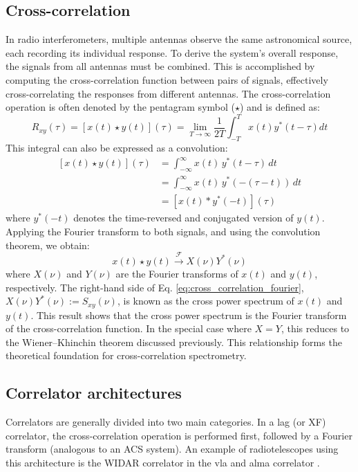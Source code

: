 \subsection{Cross-correlation}
\label{sec:cross_correlation}
In radio interferometers, multiple antennas observe the same astronomical source, each recording its individual response. To derive the system's overall response, the signals from all antennas must be combined. This is accomplished by computing the cross-correlation function between pairs of signals, effectively cross-correlating the responses from different antennas.
The cross-correlation operation is often denoted by the pentagram symbol ($\star$) and is defined as:
\begin{equation}
	R_{xy}(\tau)=\left[x(t) \star y(t)\right](\tau) = \lim_{T \to \infty} \frac{1}{2T} \int_{-T}^{T} x(t) y^*(t - \tau) dt
\end{equation}
This integral can also be expressed as a convolution:
\begin{align}
	\left[x(t) \star y(t)\right](\tau) 
	&= \int_{-\infty}^{\infty} x(t)\, y^*(t - \tau)\, dt \\
	&= \int_{-\infty}^{\infty} x(t)\, y^*(-(\tau - t))\, dt \\
	&= \left[x(t) * y^*(-t)\right](\tau)
	\label{eq:cross_correlation}
\end{align}
where $y^*(-t)$ denotes the time-reversed and conjugated version of $y(t)$. Applying the Fourier transform to both signals, and using the convolution theorem, we obtain:
\begin{equation}
	x(t) \star y(t) \xrightarrow{\mathcal{F}} X(\nu) Y^*(\nu)
	\label{eq:cross_correlation_fourier}
\end{equation}
where $X(\nu)$ and $Y(\nu)$ are the Fourier transforms of $x(t)$ and $y(t)$, respectively. The right-hand side of Eq. \ref{eq:cross_correlation_fourier}, $X(\nu) Y^*(\nu):=S_{xy}(\nu)$, is known as the cross power spectrum of $x(t)$ and $y(t)$. This result shows that the cross power spectrum is the Fourier transform of the cross-correlation function. In the special case where $X = Y$, this reduces to the Wiener–Khinchin theorem discussed previously. This relationship forms the theoretical foundation for cross-correlation spectrometry.

\subsection{Correlator architectures}
\label{sec:spectrometer_architectures}
Correlators are generally divided into two main categories. In a lag (or XF) correlator, the cross-correlation operation is performed first, followed by a Fourier transform (analogous to an ACS system). An example of radiotelescopes using this architecture is the WIDAR correlator in the \Gls{vla} \citep{Perley_2009} and \Gls{alma} correlator \citep{ALMA_correlator}.

